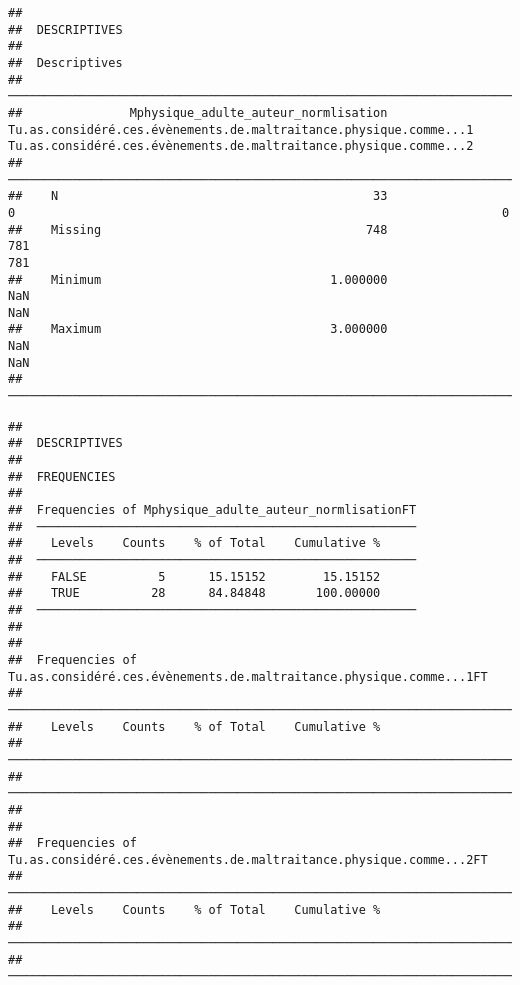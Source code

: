 \documentclass[
]{article}
\begin{document}
\begin{verbatim}
## 
##  DESCRIPTIVES
## 
##  Descriptives                                                                                                                                                                                  
##  ───────────────────────────────────────────────────────────────────────────────────────────────────────────────────────────────────────────────────────────────────────────────────────────── 
##               Mphysique_adulte_auteur_normlisation    Tu.as.considéré.ces.évènements.de.maltraitance.physique.comme...1    Tu.as.considéré.ces.évènements.de.maltraitance.physique.comme...2   
##  ───────────────────────────────────────────────────────────────────────────────────────────────────────────────────────────────────────────────────────────────────────────────────────────── 
##    N                                            33                                                                    0                                                                    0   
##    Missing                                     748                                                                  781                                                                  781   
##    Minimum                                1.000000                                                                  NaN                                                                  NaN   
##    Maximum                                3.000000                                                                  NaN                                                                  NaN   
##  ─────────────────────────────────────────────────────────────────────────────────────────────────────────────────────────────────────────────────────────────────────────────────────────────
\end{verbatim}

\begin{verbatim}
## 
##  DESCRIPTIVES
## 
##  FREQUENCIES
## 
##  Frequencies of Mphysique_adulte_auteur_normlisationFT 
##  ───────────────────────────────────────────────────── 
##    Levels    Counts    % of Total    Cumulative %   
##  ───────────────────────────────────────────────────── 
##    FALSE          5      15.15152        15.15152   
##    TRUE          28      84.84848       100.00000   
##  ───────────────────────────────────────────────────── 
## 
## 
##  Frequencies of Tu.as.considéré.ces.évènements.de.maltraitance.physique.comme...1FT 
##  ────────────────────────────────────────────────────────────────────────────────── 
##    Levels    Counts    % of Total    Cumulative %   
##  ────────────────────────────────────────────────────────────────────────────────── 
##  ────────────────────────────────────────────────────────────────────────────────── 
## 
## 
##  Frequencies of Tu.as.considéré.ces.évènements.de.maltraitance.physique.comme...2FT 
##  ────────────────────────────────────────────────────────────────────────────────── 
##    Levels    Counts    % of Total    Cumulative %   
##  ────────────────────────────────────────────────────────────────────────────────── 
##  ──────────────────────────────────────────────────────────────────────────────────
\end{verbatim}
\end{document}

